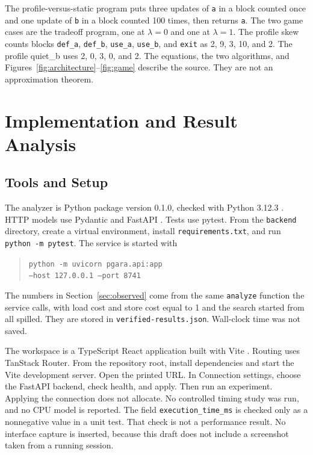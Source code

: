\documentclass{ieeeaccess}
\begin{document}
The profile-versus-static program puts three updates of \texttt{a} in a block counted once and one update of \texttt{b} in a block counted 100 times, then returns \texttt{a}.
The two game cases are the tradeoff program, one at $\lambda = 0$ and one at $\lambda = 1$.
The profile skew counts blocks \texttt{def\_a}, \texttt{def\_b}, \texttt{use\_a}, \texttt{use\_b}, and \texttt{exit} as 2, 9, 3, 10, and 2.
The profile quiet\_b uses 2, 0, 3, 0, and 2.
The equations, the two algorithms, and Figures~\ref{fig:architecture}--\ref{fig:game} describe the source.
They are not an approximation theorem.

\section{Implementation and Result Analysis}
\label{sec:results}

\subsection{Tools and Setup}
\label{sec:setup}
The analyzer is Python package version 0.1.0, checked with Python 3.12.3 \cite{python}.
HTTP models use Pydantic and FastAPI \cite{pydantic,fastapi}.
Tests use pytest.
From the \texttt{backend} directory, create a virtual environment, install \texttt{requirements.txt}, and run \texttt{python -m pytest}.
The service is started with
\begin{quote}
\texttt{python -m uvicorn pgara.api:app}\\
\texttt{--host 127.0.0.1 --port 8741}
\end{quote}
The numbers in Section~\ref{sec:observed} come from the same \texttt{analyze} function the service calls, with load cost and store cost equal to 1 and the search started from all spilled.
They are stored in \texttt{verified-\allowbreak results.json}.
Wall-clock time was not saved.

The workspace is a TypeScript React application built with Vite \cite{react,vite}.
Routing uses TanStack Router.
From the repository root, install dependencies and start the Vite development server.
Open the printed URL.
In Connection settings, choose the FastAPI backend, check health, and apply.
Then run an experiment.
Applying the connection does not allocate.
No controlled timing study was run, and no CPU model is reported.
The field \texttt{execution\_time\_ms} is checked only as a nonnegative value in a unit test.
That check is not a performance result.
No interface capture is inserted, because this draft does not include a screenshot taken from a running session.
\end{document}
